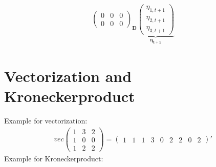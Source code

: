 \documentclass{article}
\begin{document}
\begin{enumerate}[(a)]
\begin{align*}
{\begin{pmatrix}
            0 &0&0\\
            0&0&0
  \end{pmatrix}}_{\mathbf{D}} \underbrace{\begin{pmatrix} \eta_{1,t+1}\\ \eta_{2,t+1} \\ \eta_{3,t+1}\end{pmatrix}}_{\boldsymbol{\eta_{t+1}}}
\end{align*}
\end{enumerate}

\section*{Vectorization and Kroneckerproduct}
Example for vectorization:
\begin{align*}
  vec\begin{pmatrix} 1&3&2\\1&0&0\\1&2&2 \end{pmatrix} = \begin{pmatrix} 1 &1 &1 &3 &0&2&2&0&2\end{pmatrix}'
\end{align*}
Example for Kroneckerproduct:
\end{document}
